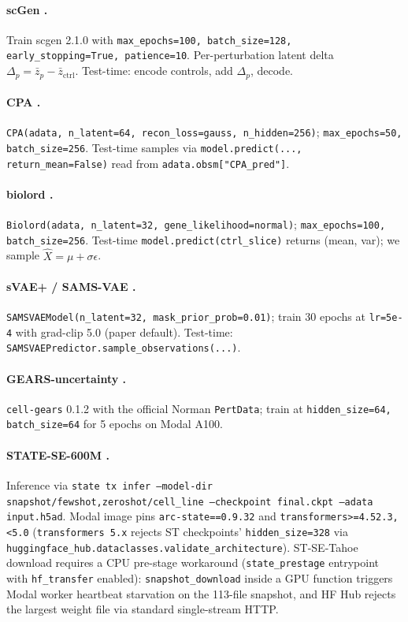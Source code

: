 \documentclass{article}
\begin{document}
\paragraph{scGen \citep{lotfollahi2019scgen}.} Train scgen 2.1.0 with \texttt{max\_epochs=100, batch\_size=128, early\_stopping=True, patience=10}. Per-perturbation latent delta $\Delta_p = \bar{z}_p - \bar{z}_{\text{ctrl}}$. Test-time: encode controls, add $\Delta_p$, decode.

\paragraph{CPA \citep{lotfollahi2023cpa}.} \texttt{CPA(adata, n\_latent=64, recon\_loss=gauss, n\_hidden=256)}; \texttt{max\_epochs=50, batch\_size=256}. Test-time samples via \texttt{model.predict(..., return\_mean=False)} read from \texttt{adata.obsm["CPA\_pred"]}.

\paragraph{biolord \citep{piran2024biolord}.} \texttt{Biolord(adata, n\_latent=32, gene\_likelihood=normal)}; \texttt{max\_epochs=100, batch\_size=256}. Test-time \texttt{model.predict(ctrl\_slice)} returns (mean, var); we sample $\hat{X} = \mu + \sigma \epsilon$.

\paragraph{sVAE+ / SAMS-VAE \citep{bereket2023}.} \texttt{SAMSVAEModel(n\_latent=32, mask\_prior\_prob=0.01)}; train 30 epochs at \texttt{lr=5e-4} with grad-clip 5.0 (paper default). Test-time: \texttt{SAMSVAEPredictor.sample\_observations(...)}.

\paragraph{GEARS-uncertainty \citep{roohani2024gears}.} \texttt{cell-gears} 0.1.2 with the official Norman \texttt{PertData}; train at \texttt{hidden\_size=64, batch\_size=64} for 5 epochs on Modal A100.

\paragraph{STATE-SE-600M \citep{adduri2025state}.} Inference via \texttt{state tx infer --model-dir {snapshot}/{fewshot,zeroshot}/{cell\_line} --checkpoint final.ckpt --adata input.h5ad}. Modal image pins \texttt{arc-state==0.9.32} and \texttt{transformers>=4.52.3,<5.0} (\texttt{transformers~5.x} rejects ST checkpoints' \texttt{hidden\_size=328} via \texttt{huggingface\_hub.dataclasses.validate\_architecture}). ST-SE-Tahoe download requires a CPU pre-stage workaround (\texttt{state\_prestage} entrypoint with \texttt{hf\_transfer} enabled): \texttt{snapshot\_download} inside a GPU function triggers Modal worker heartbeat starvation on the 113-file snapshot, and HF Hub rejects the largest weight file via standard single-stream HTTP.
\end{document}

